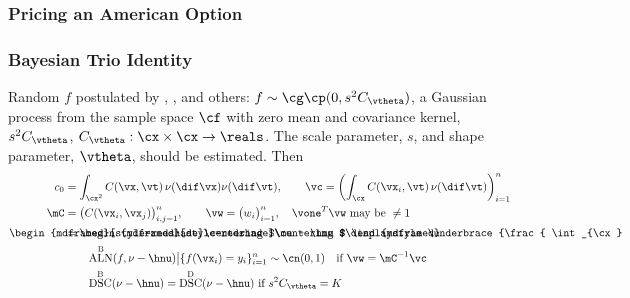 \documentclass[10pt,compress,xcolor={usenames,dvipsnames}]{beamer} %
\DeclareMathOperator{\algn}{ALN}
\DeclareMathOperator{\disc}{DSC}
\DeclareMathOperator{\Var}{VAR}
\DeclareMathOperator{\GP}{\cg\cp}
\newcommand{\Dt}{\text{D}}
\newcommand{\Ba}{\text{B}}
\newcommand{\redroundmathbox}[1]{\parbox{\widthof{$#1$\hspace{1em}}}
	{\begin{mdframed}[style=redshade]\centering $#1$ \end{mdframed}}}
\begin{document}
\begin{frame}
	\frametitle{Pricing an American Option}
\end{frame}

\begin{frame}
	\frametitle{Bayesian Trio Identity}
	\vspace*{-4ex}
	\alert{Random} $f$ postulated by \cite{Dia88a}, \cite{OHa91a}, \cite{Rit00a}  and others:  $f \sim \GP (0, s^2C_{\vtheta})$,  a \alert{Gaussian process} from the sample space $\cf$ with zero mean and covariance kernel, $s^2C_{\vtheta}$, $C_{\vtheta}:\cx \times \cx \to \reals$. The \alert{scale parameter}, $s$, and \alert{shape parameter}, $\vtheta$, should be estimated.  	 Then 
	\vspace{-1ex}
	\begin{align*}
	c_0 & = \int_{\cx^2} C(\vx,\vt) \, \nu(\dif \vx) \nu(\dif \vt), \qquad \vc = \biggl( \int_{\cx} C(\vx_i,\vt) \,\nu(\dif \vt) \biggr)_{i=1}^n \\
	\mC & = \bigl( C(\vx_i,\vx_j) \bigr)_{i,j=1}^n, \qquad \vw = \bigl(w_i \bigr)_{i=1}^n,  \quad \vone^T \vw \text{ may be } \ne 1\\
	\redroundmathbox{\mu - \hmu} 
	& = \redroundmathbox{\displaystyle%
		\underbrace{\frac{ \int_{\cx} f(\vx) \, (\nu - \hnu)(\dif\vx)}{s \sqrt{c_0 - 2 \vc^T \vw + \vw^T \mC \vw}}}_{\textstyle \algn^\Ba(f,\nu - \hnu)} \, 
		\underbrace{\sqrt{c_0 - 2 \vc^T \vw + \vw^T \mC \vw}}_{\textstyle\disc^\Ba(\nu - \hnu)} \, \underbrace{s}_{\textstyle\Var^\Ba(f)}}\\
	& \qquad \algn^\Ba(f,\nu - \hnu) \big \vert \{f(\vx_i )= y_i\}_{i=1}^n \sim \cn (0,1) \quad \text{if } \vw = \mC^{-1}\vc \\
	& \qquad \disc^\Ba(\nu - \hnu) =  \disc^\Dt(\nu - \hnu) \text{ if } s^2 C_{\vtheta} = K
	\end{align*}	
\end{frame}
\end{document}
